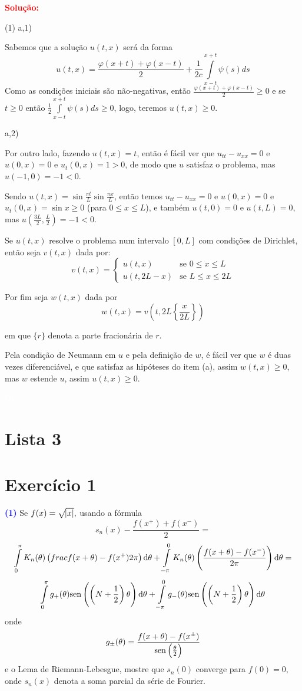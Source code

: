 \documentclass[11pt,a4paper]{article}
\newcommand{\exercicio}[1]{\section*{Exercício #1} \textcolor{blue}{\bf(#1)}}
\newcommand{\dividiritens}[1]{\begin{tasks}[counter-format={(tsk[a])},label-width=3.6ex, label-format = {\bfseries}, column-sep = {0pt}](1) #1 \end{tasks}}
\newcommand{\pers}[1]{\textcolor{Floresta}{$\negrito{(#1)} $}}
\newcommand{\solucao}[1]{\begin{mdframed}[style=MyFrame]
\textbf{\textcolor{red}{Solução:}} #1
\end{mdframed}\textcolor{white}{Oi} \newline}
\begin{document}
\solucao{
\dividiritens{
\task[\pers{a}]a,1)

\medskip
\noindent
Sabemos que a solução $u(t,x)$ será da forma
\[
u(t,x) = \frac{\varphi(x + t) + \varphi(x - t)}{2} + \frac{1}{2c}\int\limits_{x  - t}^{x + t} \psi(s) ds
\]
Como as condições iniciais são não-negativas, então $\frac{\varphi(x + t) + \varphi(x - t)}{2} \ge 0$ e se $t\geq 0$ então $\frac{1}{2}\int\limits_{x  -t}^{x + t} \psi(s) ds \ge 0$, logo, teremos $u(t,x) \ge 0.$

\medskip
\noindent
a,2)

\medskip
\noindent
Por outro lado, fazendo $u(t,x)=t$, então é fácil ver que $u_{tt}-u_{xx}=0$ e $u(0,x)=0$ e $u_t(0,x)=1>0$, de modo que $u$ satisfaz o problema, mas $u(-1,0)=-1<0$.

\task[\pers{b}] Sendo $u(t,x)=\sin{\frac{\pi t}{L}}\sin{\frac{\pi x}{L}}$, então temos $u_{tt}-u_{xx}=0$ e $u(0,x)=0$ e $u_t(0,x)=\sin x\geq 0$ (para $0\leq x\leq L$), e também $u(t,0)=0$ e $u(t,L)=0$, mas $u(\frac{3L}{2},\frac{L}{2})=-1<0$.

\task[\pers{c}] Se $u(t,x)$ resolve o problema num intervalo $[0,L]$ com condições de Dirichlet, então seja $v(t,x)$ dada por:
\[
v(t,x)=\begin{cases}
    u(t,x) & \text{se }0\leq x\leq L\\
    u(t,2L-x) & \text{se }L\leq x\leq 2L
\end{cases}
\]

\noindent
Por fim seja $w(t,x)$ dada por 
\[
w(t,x)=v\left(t,2L\left\{\frac{x}{2L}\right\}\right)
\]

\noindent
em que $\{r\}$ denota a parte fracionária de $r$.

\smallskip
\noindent
Pela condição de Neumann em $u$ e pela definição de $w$, é fácil ver que $w$ é duas vezes diferenciável, e que satisfaz as hipóteses do item (a), assim $w(t,x)\geq 0$, mas $w$ estende $u$, assim $u(t,x)\geq 0$.
}}



\section{\textcolor{Floresta}{Lista 3}}

\exercicio{1}
Se $f(x)= \sqrt{\abs{x}},$ usando a fórmula
\[
s_n(x) - \frac{f(x^{+}) + f(x^{-})}{2} = \]\[\int\limits_0^\pi K_n(\theta) \left( frac{f(x + \theta) - f(x^{+})}{2 \pi} \right) \dif \theta + \int\limits_{-\pi}^{0} K_n(\theta) \left( \frac{f(x + \theta) - f(x^{-}) }{2 \pi } \right) \dif \theta = \]\[ 
\int\limits_{0}^\pi g_{+}(\theta) \sen \left( \left( N + \frac{1}{2}\right) \theta  \right) \dif \theta + \int\limits_{- \pi}^0 g_{-}(\theta) \sen \left( \left( N + \frac{1}{2}\right) \theta  \right) \dif \theta
\]
onde
\[
g_{\pm} (\theta) = \frac{f(x + \theta) - f(x^{\pm})}{{\rm sen} \left(\frac{\theta}{2}  \right)}
\]
e o Lema de Riemann-Lebesgue, mostre que $s_n(0)$ converge para $f(0)=0,$ onde $s_n(x)$ denota a soma parcial da série de Fourier.
\end{document}
